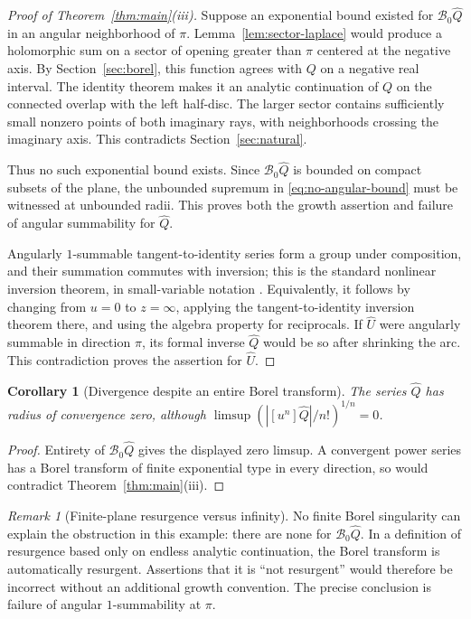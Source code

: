 \documentclass[11pt,a4paper]{article}
\numberwithin{equation}{section}
\newtheorem{corollary}[theorem]{Corollary}
\theoremstyle{definition}
\theoremstyle{remark}
\newtheorem{remark}[theorem]{Remark}
\newcommand{\B}{\mathcal B_0}
\newcommand{\U}{\widehat U}
\newcommand{\Q}{\widehat Q}
\begin{document}
\begin{proof}[Proof of Theorem~\ref{thm:main}(iii)]
Suppose an exponential bound existed for $\B\Q$ in an angular
neighborhood of $\pi$.  Lemma~\ref{lem:sector-laplace} would produce a
holomorphic sum on a sector of opening greater than $\pi$ centered at the
negative axis.  By Section~\ref{sec:borel}, this function agrees with
$Q$ on a negative real interval.  The identity theorem makes it an
analytic continuation of $Q$ on the connected overlap with the left
half-disc.  The larger sector contains sufficiently small nonzero
points of both imaginary rays, with neighborhoods crossing the imaginary
axis.  This contradicts Section~\ref{sec:natural}.

Thus no such exponential bound exists.  Since $\B\Q$ is bounded on
compact subsets of the plane, the unbounded supremum in
\eqref{eq:no-angular-bound} must be witnessed at unbounded radii.
This proves both the growth assertion and failure of angular summability
for $\Q$.

Angularly $1$-summable tangent-to-identity series form a group under
composition, and their summation commutes with inversion; this is the
standard nonlinear inversion theorem, in small-variable notation
\cite[Theorem 17.3]{sauzin}.  Equivalently, it follows by changing from
$u=0$ to $z=\infty$, applying the tangent-to-identity inversion theorem
there, and using the algebra property for reciprocals.
If $\U$ were angularly summable in direction $\pi$, its formal inverse
$\Q$ would be so after shrinking the arc.  This contradiction proves
the assertion for $\U$.
\end{proof}

\begin{corollary}[Divergence despite an entire Borel transform]
\label{cor:divergence}
The series $\Q$ has radius of convergence zero, although
$\limsup(|[u^n]\Q|/n!)^{1/n}=0$.
\end{corollary}
\begin{proof}
Entirety of $\B\Q$ gives the displayed zero limsup.  A convergent power
series has a Borel transform of finite exponential type in every
direction, so would contradict Theorem~\ref{thm:main}(iii).
\end{proof}

\begin{remark}[Finite-plane resurgence versus infinity]
No finite Borel singularity can explain the obstruction in this example:
there are none for $\B\Q$.  In a definition of resurgence based only on
endless analytic continuation, the Borel transform is automatically
resurgent.  Assertions that it is ``not resurgent'' would therefore be
incorrect without an additional growth convention.  The precise
conclusion is failure of angular $1$-summability at $\pi$.
\end{remark}
\end{document}
